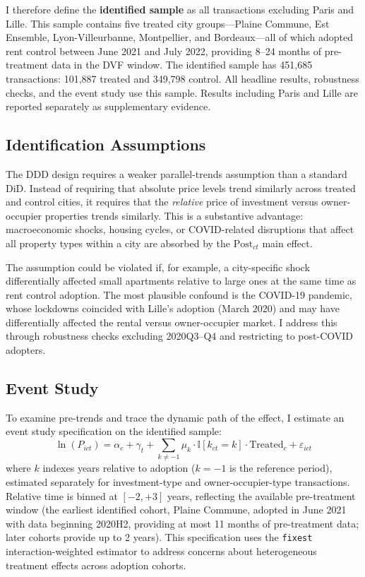 \documentclass[12pt]{article}
\newcommand{\ind}{\mathbb{I}}
\begin{document}
I therefore define the \textbf{identified sample} as all transactions excluding Paris and Lille. This sample contains five treated city groups---Plaine Commune, Est Ensemble, Lyon-Villeurbanne, Montpellier, and Bordeaux---all of which adopted rent control between June 2021 and July 2022, providing 8--24 months of pre-treatment data in the DVF window. The identified sample has 451,685 transactions: 101,887 treated and 349,798 control. All headline results, robustness checks, and the event study use this sample. Results including Paris and Lille are reported separately as supplementary evidence.

\subsection{Identification Assumptions}

The DDD design requires a weaker parallel-trends assumption than a standard DiD. Instead of requiring that absolute price levels trend similarly across treated and control cities, it requires that the \emph{relative} price of investment versus owner-occupier properties trends similarly. This is a substantive advantage: macroeconomic shocks, housing cycles, or COVID-related disruptions that affect all property types within a city are absorbed by the $\text{Post}_{ct}$ main effect.

The assumption could be violated if, for example, a city-specific shock differentially affected small apartments relative to large ones at the same time as rent control adoption. The most plausible confound is the COVID-19 pandemic, whose lockdowns coincided with Lille's adoption (March 2020) and may have differentially affected the rental versus owner-occupier market. I address this through robustness checks excluding 2020Q3--Q4 and restricting to post-COVID adopters.

\subsection{Event Study}

To examine pre-trends and trace the dynamic path of the effect, I estimate an event study specification on the identified sample:
\begin{equation}
\ln(P_{ict}) = \alpha_c + \gamma_t + \sum_{k \neq -1} \mu_k \cdot \ind[k_{ct} = k] \cdot \text{Treated}_c + \varepsilon_{ict}
\label{eq:eventstudy}
\end{equation}
where $k$ indexes years relative to adoption ($k = -1$ is the reference period), estimated separately for investment-type and owner-occupier-type transactions. Relative time is binned at $[-2, +3]$ years, reflecting the available pre-treatment window (the earliest identified cohort, Plaine Commune, adopted in June 2021 with data beginning 2020H2, providing at most 11 months of pre-treatment data; later cohorts provide up to 2 years). This specification uses the \texttt{fixest} interaction-weighted estimator \citep{sunandabraham2021} to address concerns about heterogeneous treatment effects across adoption cohorts.
\end{document}

